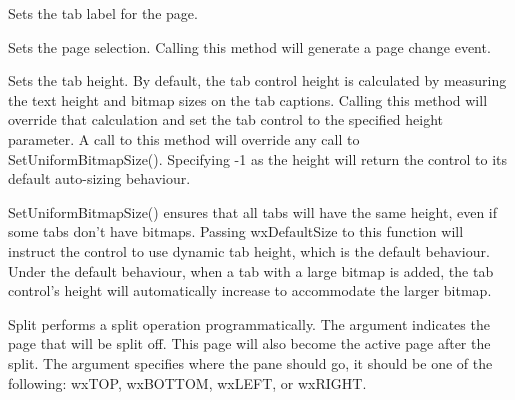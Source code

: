 Sets the tab label for the page.

\label{wxauinotebooksetselection}


Sets the page selection.  Calling this method will generate a page change event.

\label{wxauinotebooksettabctrlheight}


Sets the tab height.  By default, the tab control height is calculated
by measuring the text height and bitmap sizes on the tab captions.  Calling this
method will override that calculation and set the tab control to the specified
height parameter.  A call to this method will override any call to SetUniformBitmapSize().
Specifying -1 as the height will return the control to its default auto-sizing behaviour.

\label{wxauinotebooksetuniformbitmapsize}


SetUniformBitmapSize() ensures that all tabs will have the same height, even
if some tabs don't have bitmaps.  Passing wxDefaultSize to this function will
instruct the control to use dynamic tab height, which is the default behaviour.
Under the default behaviour, when a tab with a large bitmap is added, the tab control's
height will automatically increase to accommodate the larger bitmap.


Split performs a split operation programmatically. The argument  indicates
the page that will be split off.  This page will also become the active page after the
split.  The  argument specifies where the pane should go, it should be one
of the following: wxTOP, wxBOTTOM, wxLEFT, or wxRIGHT.





